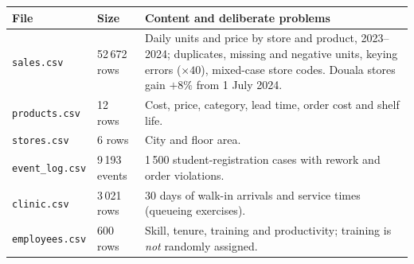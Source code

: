 \begin{center}\small
\begin{tabularx}{\linewidth}{@{}L{2.6cm}L{2.2cm}Y@{}}
\toprule
\textbf{File} & \textbf{Size} & \textbf{Content and deliberate problems}\\\midrule
\texttt{sales.csv} & 52\,672 rows & Daily units and price by store and product, 2023--2024; duplicates, missing and negative units, keying errors ($\times40$), mixed-case store codes. Douala stores gain $+8\%$ from 1 July 2024.\\
\texttt{products.csv} & 12 rows & Cost, price, category, lead time, order cost and shelf life.\\
\texttt{stores.csv} & 6 rows & City and floor area.\\
\texttt{event\_log.csv} & 9\,193 events & 1\,500 student-registration cases with rework and order violations.\\
\texttt{clinic.csv} & 3\,021 rows & 30 days of walk-in arrivals and service times (queueing exercises).\\
\texttt{employees.csv} & 600 rows & Skill, tenure, training and productivity; training is \emph{not} randomly assigned.\\\bottomrule
\end{tabularx}
\end{center}


